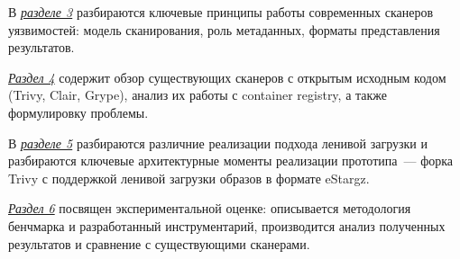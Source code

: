 В \hyperref[sec:Chapter2]{\textit{разделе 3}} разбираются ключевые принципы работы современных сканеров уязвимостей: модель сканирования, роль метаданных, форматы представления результатов.

\hyperref[sec:Chapter3]{\textit{Раздел 4}} содержит обзор существующих сканеров с открытым исходным кодом (Trivy, Clair, Grype), анализ их работы с container registry, а также формулировку проблемы.

В \hyperref[sec:Chapter4]{\textit{разделе 5}} разбираются различние реализации подхода ленивой загрузки и разбираются ключевые архитектурные моменты реализации прототипа~--- форка Trivy с поддержкой ленивой загрузки образов в формате eStargz.

\hyperref[sec:Chapter5]{\textit{Раздел 6}} посвящен экспериментальной оценке: описывается методология бенчмарка и разработанный инструментарий, производится анализ полученных результатов и сравнение с существующими сканерами.

\newpage
